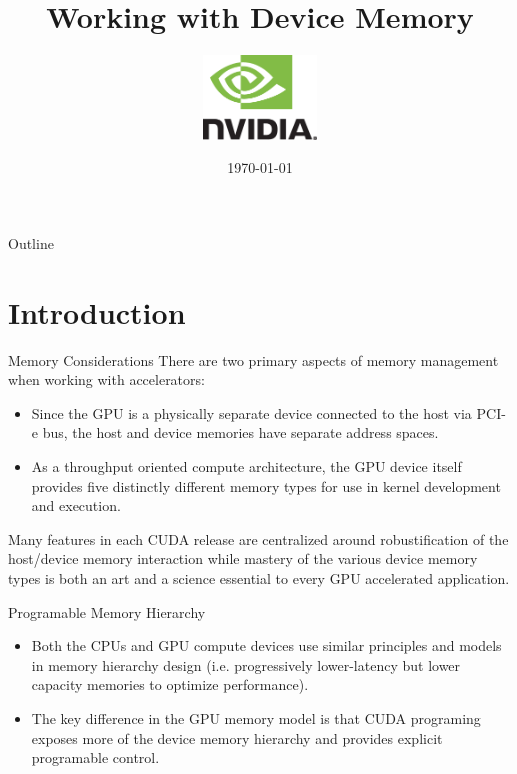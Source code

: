 \documentclass[handout]{beamer}
\title{Working with Device Memory}
\author{
    \includegraphics[width=3cm]{../media/logo/NVLogo_2D.eps}
    \vspace{0.75cm}
    \\}
\date{\today}
\begin{document}
\frame{\titlepage}

\begin{frame}{Outline}
\tableofcontents
\end{frame}



\section{Introduction}
\begin{frame}{Memory Considerations}
There are two primary aspects of memory management when working with accelerators:
\hfill\break
\begin{itemize}
\itemsep1em
    \item<1->Since the GPU is a physically separate device connected to the host via PCI-e bus, the host and device memories have separate address spaces.
    \item<1->As a throughput oriented compute architecture, the GPU device itself provides five distinctly different memory types for use in kernel development and execution.
\end{itemize}
\hfill\break
Many features in each CUDA release are centralized around robustification of the host/device memory interaction while mastery of the various device memory types is both an art and a science essential to every GPU accelerated application.
\end{frame}

\begin{frame}{Programable Memory Hierarchy}
\begin{itemize}
	\item<1->Both the CPUs and GPU compute devices use similar principles and models in memory hierarchy design (i.e. progressively lower-latency but lower capacity memories to optimize performance).
	\item<1->The key difference in the GPU memory model is that CUDA programing exposes more of the device memory hierarchy and provides explicit programable control. 
\end{itemize}
\end{frame}
\end{document}
